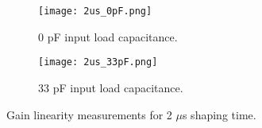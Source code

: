 \documentclass[../main/thesis.tex]{subfiles}
\begin{document}
\begin{figure} %
	\centering
	\begin{subfigure}{.5\textwidth}
		\centering
		\texttt{[image: 2us\_0pF.png]}
		\caption{0 pF input load capacitance.}
		\label{fig-gainlin-2-0}
	\end{subfigure}%
	\begin{subfigure}{.5\textwidth}
		\centering
		\texttt{[image: 2us\_33pF.png]}
		\caption{33 pF input load capacitance.}
		\label{fig-gainlin-2-33} 
	\end{subfigure}
	\caption{Gain linearity measurements for 2 $\mu$s shaping time.}
	\label{fig-gainlin-2}
\end{figure}
\end{document}

